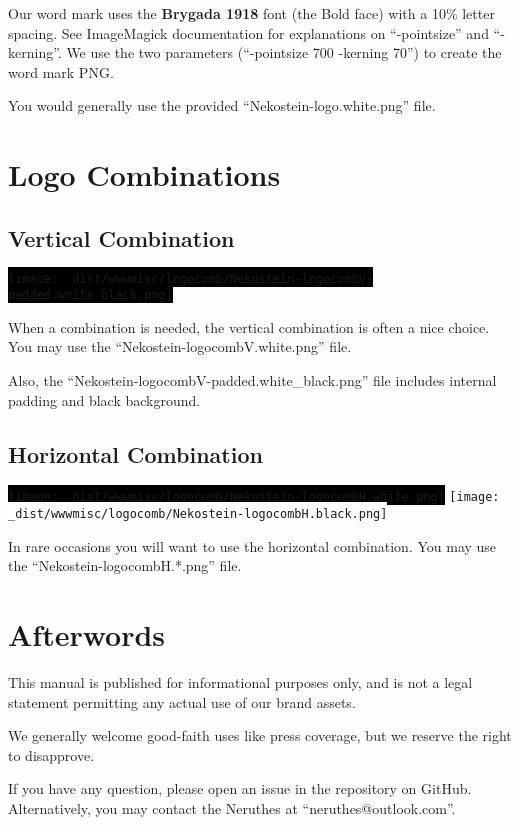 \documentclass[a4paper,11pt]{report}
\newcommand{\altfbox}[1]{%
    \colorbox{black}{#1}%
}
\begin{document}
Our word mark uses the \textbf{Brygada 1918} font (the Bold face) with a 10\% letter spacing.
See ImageMagick documentation for explanations on ``-pointsize'' and ``-kerning''.
We use the two parameters (``-pointsize 700 -kerning 70'') to create the word mark PNG.

You would generally use the provided ``Nekostein-logo.white.png'' file.






\chapter{Logo Combinations}

\section{Vertical Combination}
\altfbox{\texttt{[image: \_dist/wwwmisc/logocomb/Nekostein-logocombV-padded.white\_black.png]}}

When a combination is needed, the vertical combination is often a nice choice.
You may use the ``Nekostein-logocombV.white.png'' file.

Also, the ``Nekostein-logocombV-padded.white\_black.png'' file includes internal padding and black background.

\section{Horizontal Combination}
\altfbox{\texttt{[image: \_dist/wwwmisc/logocomb/Nekostein-logocombH.white.png]}}\hfill%
\colorbox{white}{\texttt{[image: \_dist/wwwmisc/logocomb/Nekostein-logocombH.black.png]}}

In rare occasions you will want to use the horizontal combination.
You may use the ``Nekostein-logocombH.*.png'' file.








\chapter{Afterwords}
This manual is published for informational purposes only,
and is not a legal statement permitting any actual use of our brand assets.

We generally welcome good-faith uses like press coverage,
but we reserve the right to disapprove.

If you have any question, please open an issue in the repository on GitHub.
Alternatively, you may contact the Neruthes at ``neruthes@outlook.com''.
\end{document}
